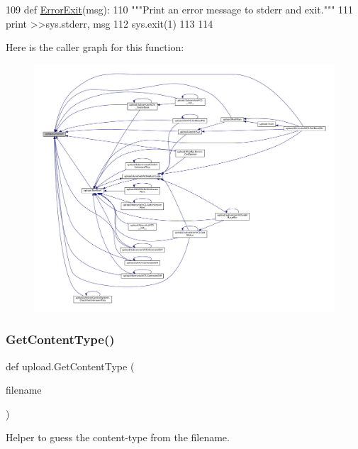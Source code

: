 \begin{DoxyCode}
109 \textcolor{keyword}{def }\hyperlink{namespaceupload_adea53186a1d73e92cc839b7c35c2c044}{ErrorExit}(msg):
110   \textcolor{stringliteral}{"""Print an error message to stderr and exit."""}
111   \textcolor{keywordflow}{print} >>sys.stderr, msg
112   sys.exit(1)
113 
114 
\end{DoxyCode}
Here is the caller graph for this function\+:
\nopagebreak
\begin{figure}[H]
\begin{center}
\leavevmode
\includegraphics[width=350pt]{namespaceupload_adea53186a1d73e92cc839b7c35c2c044_icgraph}
\end{center}
\end{figure}
\mbox{\label{namespaceupload_a753a004706d964335ad218628e07b063}} 
\subsubsection{\texorpdfstring{Get\+Content\+Type()}{GetContentType()}}
{\footnotesize\ttfamily def upload.\+Get\+Content\+Type (\begin{DoxyParamCaption}\item[{}]{filename }\end{DoxyParamCaption})}

\begin{DoxyVerb}Helper to guess the content-type from the filename.\end{DoxyVerb}
 

